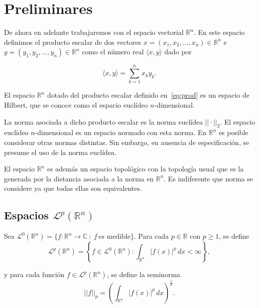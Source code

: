 \chapter{Preliminares}

De ahora en adelante trabajaremos con el espacio vectorial $\mathbb{R}^n$. En este espacio definimos el producto escalar de dos vectores \( x = (x_1, x_2, \ldots, x_n) \in \mathbb{R}^n \) e \( y = (y_1, y_2, \ldots, y_n) \in \mathbb{R}^n \) como el número real $\langle x, y \rangle$ dado por

\begin{equation}\label{eq:prod}
    \langle x, y \rangle = \sum_{k=1}^{n} x_k y_k.
\end{equation}
 
\noindent El espacio $\mathbb{R}^n$ dotado del producto escalar definido en~\eqref{eq:prod} es un espacio de Hilbert, que se conoce como el espacio euclídeo $n$-dimensional. 

\noindent La norma asociada a
dicho producto escalar es la norma euclídea $||\cdot||_2$. El espacio euclídeo $n$-dimensional es un espacio normado con esta norma. En $\mathbb{R}^n$ es posible considerar otras normas distintas. Sin embargo, en ausencia de especificación, se presume el uso de la norma euclídea.

\noindent El espacio $\mathbb{R}^n$ es además un espacio topológico con la topología usual que es la generada por la distancia asociada a la norma en $\mathbb{R}^n$. Es indiferente que norma se considere ya que todas ellas son equivalentes.


\section{Espacios $\mathscr{L}^p(\mathbb{R}^n)$}

\noindent Sea $\mathscr{L}^0(\mathbb{R}^n) = \{f: \mathbb{R}^n \rightarrow \mathbb{C}\ : \  f \ \text{es medible}\}$. Para cada $p \in \mathbb{R}$ con $p \geq 1$, se define
\begin{equation}
    \mathscr{L}^p(\mathbb{R}^n) = \left\{ f \in \mathscr{L}^0(\mathbb{R}^n): \int_{\mathbb{R}^n} |f(x)|^p \, dx < \infty \right\},
\end{equation}

\noindent y para cada función $f \in \mathscr{L}^p(\mathbb{R}^n)$, se define la seminorma
\begin{equation}
    ||f||_p = \left( \int_{\mathbb{R}^n}|f(x)|^p  \, dx \right)^{\frac{1}{p}}.
\end{equation}

